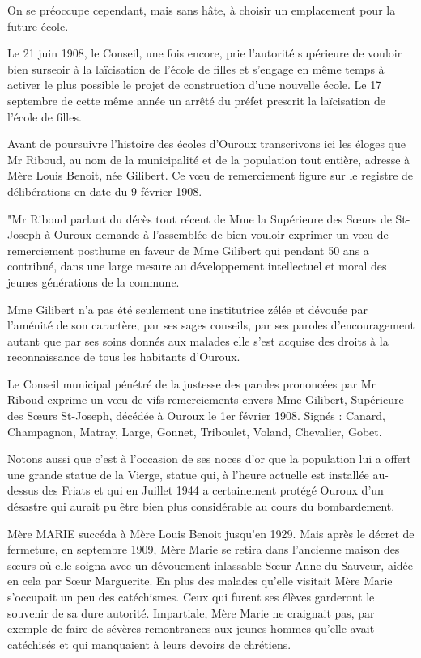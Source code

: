 On se préoccupe cependant, mais sans hâte, à choisir un emplacement pour la future école.

Le 21 juin 1908, le Conseil, une fois encore, prie l'autorité supérieure de vouloir bien surseoir à la laïcisation de l'école de filles et s'engage en même temps à activer le plus possible le projet de construction d'une nouvelle école. Le 17 septembre de cette même année un arrêté du préfet prescrit la laïcisation de l'école de filles.

Avant de poursuivre l'histoire des écoles d'Ouroux transcrivons ici les éloges que Mr Riboud, au nom de la municipalité et de la population tout entière, adresse à Mère Louis Benoit, née Gilibert. Ce vœu de remerciement figure sur le registre de délibérations en date du 9 février 1908.

"Mr Riboud parlant du décès tout récent de Mme la Supérieure des Sœurs de St-Joseph à Ouroux demande à l'assemblée de bien vouloir exprimer un vœu de remerciement posthume en faveur de Mme Gilibert qui pendant 50 ans a contribué, dans une large mesure au développement intellectuel et moral des jeunes générations de la commune.

Mme Gilibert n'a pas été seulement une institutrice zélée et dévouée par l'aménité de son caractère, par ses sages conseils, par ses paroles d'encouragement autant que par ses soins donnés aux malades elle s'est acquise des droits à la reconnaissance de tous les habitants d'Ouroux.

Le Conseil municipal pénétré de la justesse des paroles prononcées par Mr Riboud exprime un vœu de vifs remerciements envers Mme Gilibert, Supérieure des Sœurs St-Joseph, décédée à Ouroux le 1er février 1908. Signés : Canard, Champagnon, Matray, Large, Gonnet, Triboulet, Voland, Chevalier, Gobet.

Notons aussi que c'est à l'occasion de ses noces d'or que la population lui a offert une grande statue de la Vierge, statue qui, à l'heure actuelle est installée au-dessus des Friats et qui en Juillet 1944 a certainement protégé Ouroux d'un désastre qui aurait pu être bien plus considérable au cours du bombardement.

Mère MARIE succéda à Mère Louis Benoit jusqu'en 1929. Mais après le décret de fermeture, en septembre 1909, Mère Marie se retira dans l'ancienne maison des sœurs où elle soigna avec un dévouement inlassable Sœur Anne du Sauveur, aidée en cela par Sœur Marguerite. En plus des malades qu'elle visitait Mère Marie s'occupait un peu des catéchismes. Ceux qui furent ses élèves garderont le souvenir de sa dure autorité. Impartiale, Mère Marie ne craignait pas, par exemple de faire de sévères remontrances aux jeunes hommes qu'elle avait catéchisés et qui manquaient à leurs devoirs de chrétiens.

